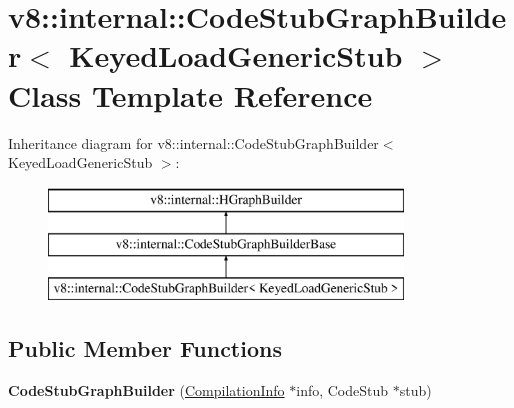 \hypertarget{classv8_1_1internal_1_1_code_stub_graph_builder_3_01_keyed_load_generic_stub_01_4}{}\section{v8\+:\+:internal\+:\+:Code\+Stub\+Graph\+Builder$<$ Keyed\+Load\+Generic\+Stub $>$ Class Template Reference}
\label{classv8_1_1internal_1_1_code_stub_graph_builder_3_01_keyed_load_generic_stub_01_4}
Inheritance diagram for v8\+:\+:internal\+:\+:Code\+Stub\+Graph\+Builder$<$ Keyed\+Load\+Generic\+Stub $>$\+:\begin{figure}[H]
\begin{center}
\leavevmode
\includegraphics[height=3.000000cm]{classv8_1_1internal_1_1_code_stub_graph_builder_3_01_keyed_load_generic_stub_01_4}
\end{center}
\end{figure}
\subsection*{Public Member Functions}
\begin{DoxyCompactItemize}
\item 
{\bfseries Code\+Stub\+Graph\+Builder} (\hyperlink{classv8_1_1internal_1_1_compilation_info}{Compilation\+Info} $\ast$info, Code\+Stub $\ast$stub)\hypertarget{classv8_1_1internal_1_1_code_stub_graph_builder_3_01_keyed_load_generic_stub_01_4_a10213381b8a475113e69c3952da21860}{}\label{classv8_1_1internal_1_1_code_stub_graph_builder_3_01_keyed_load_generic_stub_01_4_a10213381b8a475113e69c3952da21860}

\end{DoxyCompactItemize}
